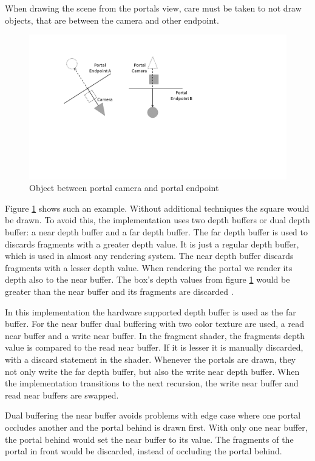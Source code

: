 When drawing the scene from the portals view, care must be taken to not draw objects, that are between the camera and other endpoint.
\begin{figure}[h]
	\includegraphics[width=\linewidth]{images/bananajuce.png}
	\caption{Object between portal camera and portal endpoint}
	\label{fig:bananajuce}
\end{figure}

Figure \ref{fig:bananajuce} shows such an example. Without additional techniques the square would be drawn. To avoid this, the implementation uses two depth buffers or dual depth buffer: a near depth buffer and a far depth buffer. The far depth buffer is used to discards fragments with a greater depth value. It is just a regular depth buffer, which is used in almost any rendering system. The near depth buffer discards fragments with a lesser depth value. When rendering the portal we render its depth also to the near buffer. The box's depth values from figure \ref{fig:bananajuce} would be greater than the near buffer and its fragments are discarded \cite{lowe:2005:technique}.

In this implementation the hardware supported depth buffer is used as the far buffer. For the near buffer dual buffering with two color texture are used, a read near buffer and a write near buffer. In the fragment shader, the fragments depth value is compared to the read near buffer. If it is lesser it is manually discarded, with a discard statement in the shader. Whenever the portals are drawn, they not only write the far depth buffer, but also the write near depth buffer. When the implementation transitions to the next recursion, the write near buffer and read near buffers are swapped.

Dual buffering the near buffer avoids problems with edge case where one portal occludes another and the portal behind is drawn first. With only one near buffer, the portal behind would set the near buffer to its value. The fragments of the portal in front would be discarded, instead of occluding the portal behind.

